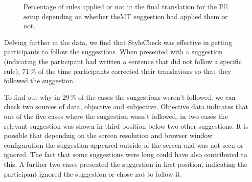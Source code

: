 \begin{figure}[H]
\myfloatalign
{}
\caption{Percentage of rules applied or not in the final translation for the \ac{PE} setup depending on whether the\ac{MT} suggestion had applied them or not.}
\label{fig:rules_3}
\end{figure}

Delving further in the data, we find that StyleCheck was effective in getting participants to follow the suggestions. When presented with a suggestion (indicating the participant had written a sentence that did not follow a specific rule), 71\,\% of the time participants corrected their translations so that they followed the suggestion. 

To find out why in 29\,\% of the cases the suggestions weren't followed, we can check two sources of data, objective and subjective. Objective data indicates that out of the five cases where the suggestion wasn't followed, in two cases the relevant suggestion was shown in third position below two other suggestions. It is possible that depending on the screen resolution and browser window configuration the suggestion appeared outside of the screen and was not seen or ignored. The fact that some suggestions were long could have also contributed to this. A further two cases presented the suggestion in first position, indicating the participant ignored the suggestion or chose not to follow it. 

